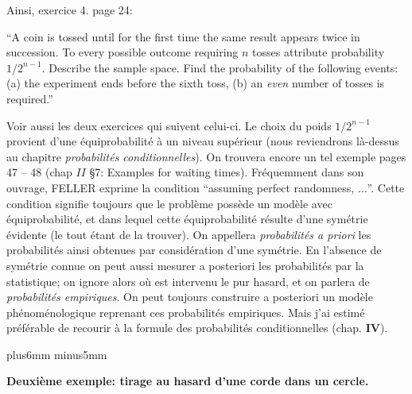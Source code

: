 {Ainsi, exercice 4. page 24: 
\smallskip 
{\leftskip=28pt \rightskip=10pt  ``A coin is tossed until for the first time the same result 
appears twice in succession. To every possible outcome requiring $n$ 
tosses attribute probability $1 / 2^{n-1}$. Describe the sample space.  
Find the probability of the following events: (a) the experiment ends 
before the sixth toss, (b) an {\it even} number of tosses is required.''\par}
\smallskip 
Voir aussi les deux exercices qui suivent celui-ci.  
\smallskip 
Le choix du poids $1 / 2^{n-1}$ provient d'une \'equiprobabilit\'e \`a un  
niveau sup\'erieur (nous reviendrons l\`a-dessus au chapitre {\it 
probabilit\'es conditionnelles}). On trouvera encore un tel exemple  
pages 47 -- 48 (chap $II$ \S 7: Examples for waiting times). 
Fr\'equemment dans son ouvrage, F{\eightrm ELLER} exprime la 
condition ``assuming perfect randomness, $\ldots$''. Cette condition 
signifie toujours que le probl\`eme poss\`ede un mod\`ele avec 
\'equiprobabilit\'e, et dans lequel cette \'equiprobabilit\'e r\'esulte 
d'une sym\'etrie \'evidente (le tout \'etant de la trouver). On appellera  
{\it probabilit\'es a priori} les probabilit\'es ainsi obtenues par 
consid\'eration d'une sym\'etrie. En l'absence de sym\'etrie connue on  
peut aussi mesurer a posteriori les probabilit\'es par la statistique; on 
ignore alors o\`u est intervenu le pur hasard, et on parlera de {\it 
probabilit\'es empiriques}. On peut toujours construire a posteriori un 
mod\`ele ph\'enom\'enologique reprenant ces probabilit\'es empiriques. 
Mais j'ai estim\'e pr\'ef\'erable de recourir \`a la formule des 
probabilit\'es conditionnelles (chap. {\bf IV}). 
 
} %
 
\vskip7mm plus6mm minus5mm
 
{\bf Deuxi\`eme exemple: tirage au hasard d'une corde 
dans un cercle.} 

